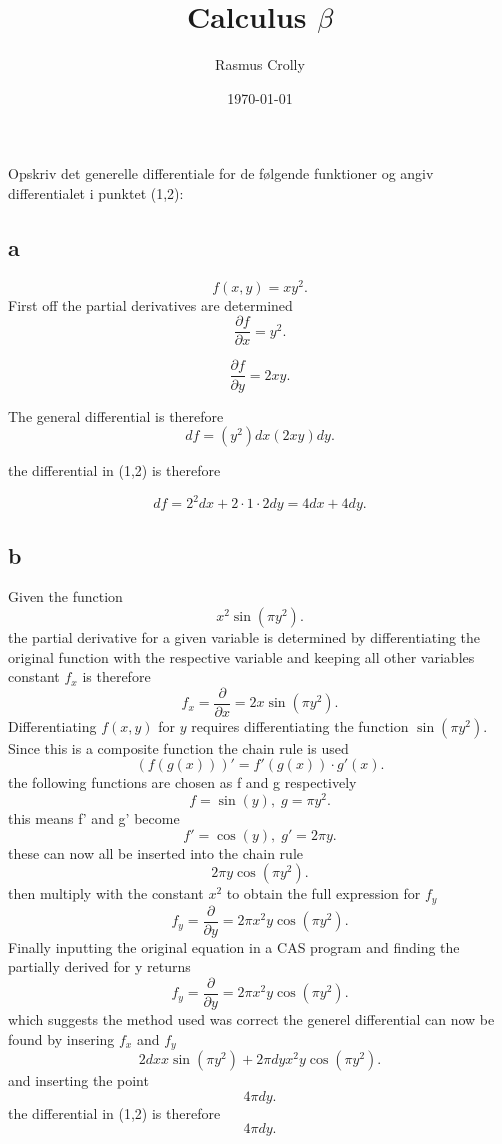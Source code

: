 \documentclass[12pt,a4paper]{article}
\title{Calculus $\beta$}
\author{Rasmus Crolly}
\date{\today}
\begin{document}
\maketitle

Opskriv det generelle differentiale for de følgende funktioner og angiv differentialet i punktet (1,2):
\subsection{a}


\[
	f\left( x,y \right)=xy^2 
.\] 
First off the partial derivatives are determined
\[
\frac{\partial f}{\partial x}=y^2
.\] 

\[
\frac{\partial f}{\partial y}=2xy 
.\] 

The general differential is therefore \[
	df=\left( y^2 \right) dx\left( 2xy \right) dy
.\] 


the  differential in (1,2) is therefore

\[
df=2^2dx+2\cdot 1\cdot 2 dy=4dx+4dy
.\] 


\subsection{b}
Given the function \[ x^{2} \sin{\left(\pi y^{2} \right)} .\]the partial derivative for a given variable is determined by differentiating the original function with the respective variable and keeping all other variables constant 
$f_x$ is therefore
\[ f_x = \frac{\partial}{\partial x} = 2 x \sin{\left(\pi y^{2} \right)} .\]
Differentiating $f(x,y)$ for $y$ requires differentiating the function $ \sin{\left(\pi y^{2} \right)} .$
Since this is a composite function the chain rule is used
\[ (f(g(x)))'=f'(g(x))\cdot g'(x) .\]
the following functions are chosen as f and g respectively
\[ f = \sin{\left(y \right)} ,\; g = \pi y^{2} .\]
this means f' and g' become
\[ f' = \cos{\left(y \right)} ,\; g' = 2 \pi y .\]
these can now all be inserted into the chain rule
\[ 2 \pi y \cos{\left(\pi y^{2} \right)} .\]
then multiply with the constant $ x^{2} $ to obtain the full expression for $f_y$
\[ f_y = \frac{\partial}{\partial y} = 2 \pi x^{2} y \cos{\left(\pi y^{2} \right)} .\]
Finally inputting the original equation in a CAS program and finding the partially derived for y returns
\[ f_y = \frac{\partial}{\partial y} = 2 \pi x^{2} y \cos{\left(\pi y^{2} \right)} .\]
which suggests the method used was correct
the generel differential can now be found by insering $f_x$ and $f_y$
\[ 2 dx x \sin{\left(\pi y^{2} \right)} + 2 \pi dy x^{2} y \cos{\left(\pi y^{2} \right)} .\]
and inserting the point
\[ 4 \pi dy .\]
the differential in (1,2) is therefore
\[ 4 \pi dy .\]
\end{document}
